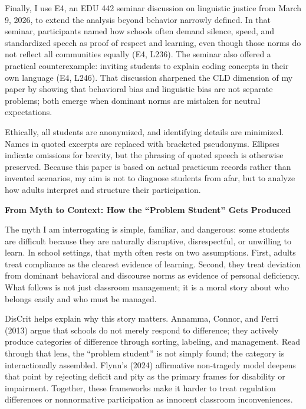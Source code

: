 \documentclass[12pt]{article}
\newcommand{\levelone}[1]{\begin{center}\textbf{#1}\end{center}}
\newcommand{\EvidenceSet}[1]{\textsc{E#1}}
\begin{document}
Finally, I use \EvidenceSet{4}, an EDU 442 seminar discussion on linguistic justice from March 9, 2026, to extend the analysis beyond behavior narrowly defined. In that seminar, participants named how schools often demand silence, speed, and standardized speech as proof of respect and learning, even though those norms do not reflect all communities equally (\EvidenceSet{4}, L236). The seminar also offered a practical counterexample: inviting students to explain coding concepts in their own language (\EvidenceSet{4}, L246). That discussion sharpened the CLD dimension of my paper by showing that behavioral bias and linguistic bias are not separate problems; both emerge when dominant norms are mistaken for neutral expectations.

Ethically, all students are anonymized, and identifying details are minimized. Names in quoted excerpts are replaced with bracketed pseudonyms. Ellipses indicate omissions for brevity, but the phrasing of quoted speech is otherwise preserved. Because this paper is based on actual practicum records rather than invented scenarios, my aim is not to diagnose students from afar, but to analyze how adults interpret and structure their participation.

\levelone{From Myth to Context: How the ``Problem Student'' Gets Produced}

The myth I am interrogating is simple, familiar, and dangerous: some students are difficult because they are naturally disruptive, disrespectful, or unwilling to learn. In school settings, that myth often rests on two assumptions. First, adults treat compliance as the clearest evidence of learning. Second, they treat deviation from dominant behavioral and discourse norms as evidence of personal deficiency. What follows is not just classroom management; it is a moral story about who belongs easily and who must be managed.

DisCrit helps explain why this story matters. Annamma, Connor, and Ferri (2013) argue that schools do not merely respond to difference; they actively produce categories of difference through sorting, labeling, and management. Read through that lens, the ``problem student'' is not simply found; the category is interactionally assembled. Flynn's (2024) affirmative non-tragedy model deepens that point by rejecting deficit and pity as the primary frames for disability or impairment. Together, these frameworks make it harder to treat regulation differences or nonnormative participation as innocent classroom inconveniences.
\end{document}
